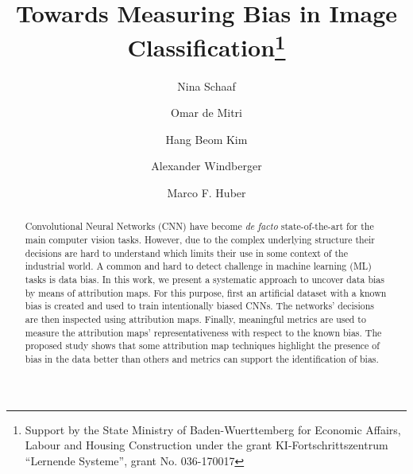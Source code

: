 \documentclass[runningheads]{llncs}
\begin{document}
\title{Towards Measuring Bias in Image Classification\thanks{Support by the State Ministry of Baden-Wuerttemberg for Economic Affairs, Labour and Housing Construction under the grant KI-Fortschrittszentrum \enquote{Lernende Systeme}, grant No. 036-170017}}
%
\author{Nina Schaaf \and
Omar de Mitri \and
Hang Beom Kim \and
Alexander Windberger \and
Marco F. Huber
}
%
%
%
\maketitle              %
%

\begin{abstract}
Convolutional Neural Networks (CNN) have become \emph{de facto} state-of-the-art for the main computer vision tasks.
However, due to the complex underlying structure their decisions are hard to understand which limits their use in some context of the industrial world. A common and hard to detect challenge in machine learning (ML) tasks is data bias. In this work, we present a systematic approach to uncover data bias by means of attribution maps. For this purpose, first an artificial dataset with a known bias is created and used to train intentionally biased CNNs. The networks' decisions are then inspected using attribution maps. Finally, meaningful metrics are used to measure the attribution maps' representativeness with respect to the known bias. The proposed study shows that some attribution map techniques highlight the presence of bias in the data better than others and metrics can support the identification of bias.

\end{abstract}
%
%
%
\end{document}
